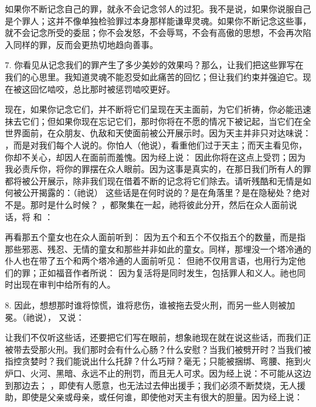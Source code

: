 如果你不断记念自己的罪，就永不会记念邻人的过犯。我不是说，如果你说服自己是个罪人；这并不像单独检验罪过本身那样能谦卑灵魂。如果你不断记念这些事，就不会记念所受的委屈；你不会发怒，不会辱骂，不会有高傲的思想，不会再次陷入同样的罪，反而会更热切地趋向善事。\par

7. 你看见从记念我们的罪产生了多少美妙的效果吗？那么，让我们把这些罪写在我们的心思里。我知道灵魂不能忍受如此痛苦的回忆；但让我们约束并强迫它。现在被这回忆啮咬，总比那时被惩罚啮咬更好。\par

现在，如果你记念它们，并不断将它们呈现在天主面前，为它们祈祷，你必能迅速抹去它们；但如果你现在忘记它们，那时你将在不愿的情况下被记起，当它们在全世界面前，在众朋友、仇敌和天使面前被公开展示时。因为天主并非只对达味说：  ，而是对我们每个人说的。你怕人（他说），看重他们过于天主；而天主看见你，你却不关心，却因人在面前而羞愧。因为经上说： 因此你将在这点上受罚；因为我必责斥你，将你的罪摆在众人眼前。因为这事是真实的，在那日我们所有人的罪都将被公开展示，除非我们现在借着不断的记念将它们除去。请听残酷和无情是如何被公开揭露的：（祂说）  这些话是在何时说的？是在角落里？是在隐秘处？绝对不是。那时是什么时候？ ，都聚集在一起，祂将彼此分开，然后在众人面前说话，将 和 ：\par

再看那五个童女也在众人面前听到：  因为五个和五个不仅指五个的数量，而是指那些邪恶、残忍、无情的童女和那些并非如此的童女。同样，那埋没一个塔冷通的仆人也在带了五个和两个塔冷通的人面前听见：  但祂不仅用言语，也用行为定他们的罪；正如福音作者所说：  因为复活将是同时发生，包括罪人和义人。祂也同时出现在审判中给所有的人。\par

8. 因此，想想那时谁将惊慌，谁将悲伤，谁被拖去受火刑，而另一些人则被加冕。（祂说），  又说： \par

让我们不仅听这些话，还要把它们写在眼前，想象祂现在就在说这些话，而我们正被带去受那火刑。我们那时会有什么心肠？什么安慰？当我们被劈开时？当我们被指控贪婪时？我们能说出什么托辞？什么巧辩？毫无；只能被捆绑、弯腰、拖到火炉口、火河、黑暗、永远不止的刑罚，而且无人可求。因为经上说：不可能从这边到那边去； ，即使有人愿意，也无法过去伸出援手；我们必须不断焚烧，无人援助，即使是父亲或母亲，或任何谁，即使他对天主有很大的胆量。因为经上说： \par

